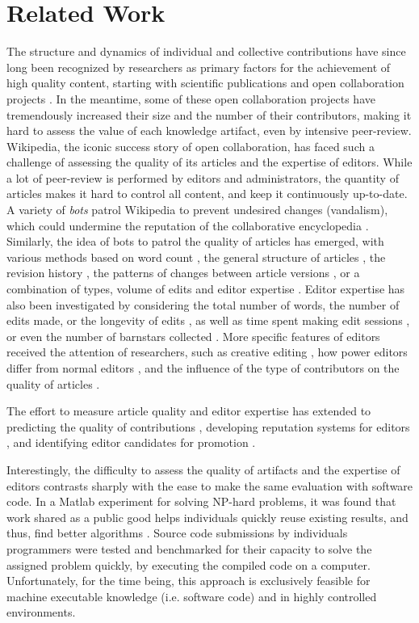 \section{Related Work}
The structure and dynamics of individual and collective contributions have since long been recognized by researchers as primary factors for the achievement of high quality content, starting with scientific publications \cite{newman2001} and open collaboration projects \cite{bryant2005}. In the meantime, some of these open collaboration projects have tremendously increased their size and the number of their contributors, making it hard to assess the value of each knowledge artifact, even by intensive peer-review. Wikipedia, the iconic success story of open collaboration, has faced such a challenge of assessing the quality of its articles and the expertise of editors. While a lot of peer-review is performed by editors and administrators, the quantity of articles makes it hard to control all content, and keep it continuously up-to-date. A variety of {\it bots} patrol Wikipedia to prevent undesired changes (vandalism), which could undermine the reputation of the collaborative encyclopedia \cite{}. Similarly, the idea of bots to patrol the quality of articles has emerged, with various methods based on word count \cite{blumenstock2008sizematters}, the general structure of articles \cite{wang2013tell}, the revision history \cite{hu2007articlequality}, the patterns of changes between article versions \cite{woehner2009}, or a combination of types, volume of edits and editor expertise \cite{kane2011}. Editor expertise has also been investigated by considering the total number of words, the number of edits made, or the longevity of edits \cite{adler2008measuringauthor}, as well as time spent making edit sessions \cite{geiger2013}, or even the number of barnstars collected \cite{Kriplean2008}. More specific features of editors received the attention of researchers, such as creative editing \cite{iba2010}, how power editors differ from normal editors \cite{panciera2009}, and the influence of the type of contributors on the quality of articles \cite{stein2007}.

The effort to measure article quality and editor expertise has extended to predicting the quality of contributions \cite{druck2008learning,zeng2006computingtrust}, developing reputation systems for editors \cite{adler2007contentdriven}, and identifying editor candidates for promotion \cite{burke2008taking}.

Interestingly, the difficulty to assess the quality of artifacts and the expertise of editors contrasts sharply with the ease to make the same evaluation with software code. In a Matlab experiment for solving NP-hard problems, it was found that work shared as a public good helps individuals quickly reuse existing results, and thus, find better algorithms \cite{gulley2010}. Source code submissions by individuals programmers were tested and benchmarked for their capacity to solve the assigned problem quickly, by executing the compiled code on a computer. Unfortunately, for the time being, this approach is exclusively feasible for machine executable knowledge (i.e. software code) and in highly controlled environments.

